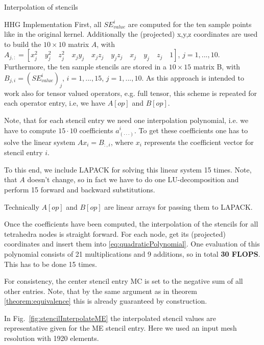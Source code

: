 \documentclass[a4paper,11pt,reqno]{amsart}
\numberwithin{figure}{section}
\numberwithin{table}{section}
\def\si{SE_{value}^i}
\begin{document}
\begin{section}{Interpolation of stencils}
\begin{subsection}{HHG Implementation}
First, all $\si$ are computed for the ten sample points like in the original kernel. 
Additionally the (projected) x,y,z coordinates are used to build the $10\times10$ 
matrix $A$, with 
$A_{j,:} = \left[x_j^2\quad y_j^2\quad z_j^2\quad x_jy_j\quad x_jz_j\quad y_jz_j\quad
x_j\quad y_j\quad z_j\quad 1\right]$, $j = 1,...,10$.
Furthermore, the ten sample stencils are stored in a $10\times15$ matrix B,
with $B_{j,i} = \left(\si\right)_j$, $i = 1,...,15$, $j=1,...,10$. 
As this approach is intended to work 
also for tensor valued operators, e.g. full tensor, this scheme is repeated for each
operator entry, i.e, we have $A[op]$ and $B[op]$.

Note, that for each stencil entry we need one interpolation polynomial, i.e. we
have to compute $15\cdot10$ coefficients $a_{(\cdot\cdot\cdot)}^i$. To get these
coefficients one has to solve the linear system $Ax_i = B_{:,i}$,
where $x_i$ represents the coefficient vector for stencil entry $i$.

To this end, we include LAPACK for solving this linear system 15 times. 
Note, that $A$ doesn't change, so in fact we have to do one LU-decomposition
and perform 15 forward and backward substitutions.

Technically $A[op]$ and $B[op]$ are linear arrays for passing them to LAPACK. 

Once the coefficients have been computed, the interpolation of the stencils for
all tetrahedra nodes is straight forward. For each node, get its (projected) coordinates
and insert them into \eqref{eq:quadraticPolynomial}. One evaluation
of this polynomial consists of 21 multiplications and 9 additions, so in total 
\textbf{30 FLOPS}. This has to be done 15 times. 

For consistency, the center stencil
entry MC is set to the negative sum of all other entries.
Note, that by the same argument as in theorem \ref{theorem:equivalence}
this is already guaranteed by construction.

In Fig.~\ref{fig:stencilInterpolateME} the interpolated stencil values are representative
given for the ME stencil entry. Here we used an input mesh resolution with 1920 elements.



\end{subsection}
\end{section}
\end{document}
